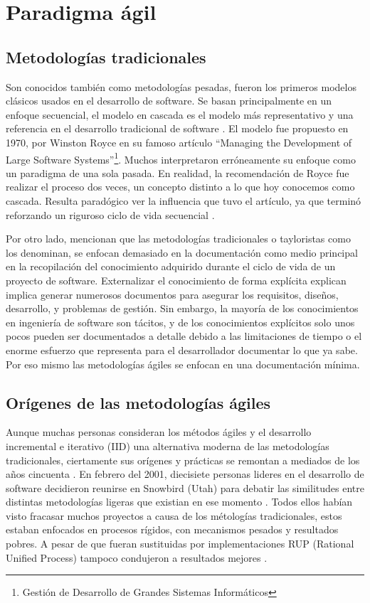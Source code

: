 \section{Paradigma ágil}

  \subsection{Metodologías tradicionales}
  Son conocidos también como metodologías pesadas, fueron los primeros modelos clásicos usados en el desarrollo de software. Se basan principalmente en un enfoque secuencial, el modelo en cascada es el modelo más representativo y una referencia en el desarrollo tradicional de software \parencite{islam:2020}. El modelo fue propuesto en 1970, por Winston Royce en su famoso artículo ``Managing the Development of Large Software Systems''\footnote{Gestión de Desarrollo de Grandes Sistemas Informáticos}. Muchos interpretaron erróneamente su enfoque como un paradigma de una sola pasada. En realidad, la recomendación de Royce fue realizar el proceso dos veces, un concepto distinto a lo que hoy conocemos como cascada. Resulta paradógico ver la influencia que tuvo el artículo, ya que terminó reforzando un riguroso ciclo de vida secuencial \parencite{larman:2003}.

  Por otro lado, \textcite{chau:2003} mencionan que las metodologías tradicionales o tayloristas como los denominan, se enfocan demasiado en la documentación como medio principal en la recopilación del conocimiento adquirido durante el ciclo de vida de un proyecto de software. Externalizar el conocimiento de forma explícita explican implica generar numerosos documentos para asegurar los requisitos, diseños, desarrollo, y problemas de gestión. Sin embargo, la mayoría de los conocimientos en ingeniería de software son tácitos, y de los conocimientos explícitos solo unos pocos pueden ser documentados a detalle debido a las limitaciones de tiempo o el enorme esfuerzo que representa para el desarrollador documentar lo que ya sabe. Por eso mismo las metodologías ágiles se enfocan en una documentación mínima.

  \subsection{Orígenes de las metodologías ágiles}
  Aunque muchas personas consideran los métodos ágiles y el desarrollo incremental e iterativo (IID) una alternativa moderna de las metodologías tradicionales, ciertamente sus orígenes y prácticas se remontan a mediados de los años cincuenta \parencite{larman:2003}. En febrero del 2001, diecisiete personas lideres en el desarrollo de software decidieron reunirse en Snowbird (Utah) para debatir las similitudes entre distintas metodologías ligeras que existian en ese momento \parencite{cockburn:2002}. Todos ellos habían visto fracasar muchos proyectos a causa de los métologías tradicionales, estos estaban enfocados en procesos rígidos, con mecanismos pesados y resultados pobres. A pesar de que fueran sustituidas por implementaciones RUP (Rational Unified Process) tampoco condujeron a resultados mejores \parencite{verheyen:2019}.

